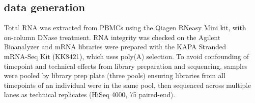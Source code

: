 \subsection{ data generation}

Total RNA was extracted from \glspl{PBMC} using the Qiagen RNeasy Mini kit, with on-column DNase treatment.
RNA integrity was checked on the Agilent Bioanalyzer and mRNA libraries were prepared with the KAPA Stranded mRNA-Seq Kit (KK8421), which uses poly(A) selection.
To avoid confounding of timepoint and technical effects from library preparation and sequencing,
samples were pooled by library prep plate (three pools) ensuring libraries from all timepoints of an individual were in the same pool, 
then sequenced across multiple lanes as technical replicates (HiSeq 4000, \SI{75}{\bp} paired-end).
%

